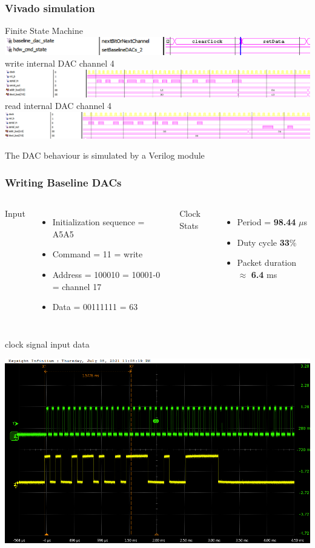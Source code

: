 \documentclass[aspectratio=169]{beamer}
\begin{document}
	\begin{frame}
	\frametitle{Vivado simulation}
		\begin{center}
			Finite State Machine
			\includegraphics[width=0.9 \textwidth]{IMG/Simulation1.png}
			\newline
			write internal DAC channel 4
			\includegraphics[width=0.9 \textwidth]{IMG/Simulation3.png}
			\newline
			read internal DAC channel 4
			\includegraphics[width=0.9 \textwidth]{IMG/Simulation4.png}
		\end{center}
	The DAC behaviour is simulated by a Verilog module
	\end{frame}

	
	\begin{frame}
	\frametitle{Writing Baseline DACs}
	\begin{columns}
		\column{0.5 \textwidth}
	{\color{blue} Input}
	\begin{itemize}
		\item Initialization sequence = A5A5
		\item Command = 11 = write
		\item Address = 100010 = 10001-0 = channel 17
		\item Data    = 00111111 = 63
	\end{itemize}
	\column{0.5 \textwidth}
	{\color{blue} Clock Stats}
	\begin{itemize}
		\item Period = \textbf{98.44} $\mu$s
		\item Duty cycle \textbf{33}\%
		\item Packet duration $\approx$ \textbf{6.4} ms
	\end{itemize}
	\end{columns}
	\begin{center}
		{\color{green} clock signal}
		{\color{yellow} input data}
	\end{center}
	\begin{center}
		\includegraphics[width=0.5 \textwidth]{IMG/probe/09-08-2021_ch17-write63-baselinedac1.png}
	\end{center}
	\end{frame}
\end{document}
